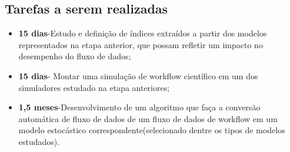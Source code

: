 \subsection{Tarefas a serem realizadas}
		\begin{itemize}
			\item \textbf{15 dias}-Estudo e definição de índices extraídos a partir dos modelos representados na etapa anterior, que possam refletir um impacto no desempenho do fluxo de dados;
			\item \textbf{15 dias}- Montar uma simulação de workflow científico em um dos simuladores estudado na etapa anteriores;
			\item \textbf{1,5 meses}-Desenvolvimento de um algoritmo que faça a conversão automática de fluxo de dados de um fluxo de dados de workflow em um modelo estocástico correspondente(selecionado dentre os tipos de modelos estudados).
		\end{itemize}
 
